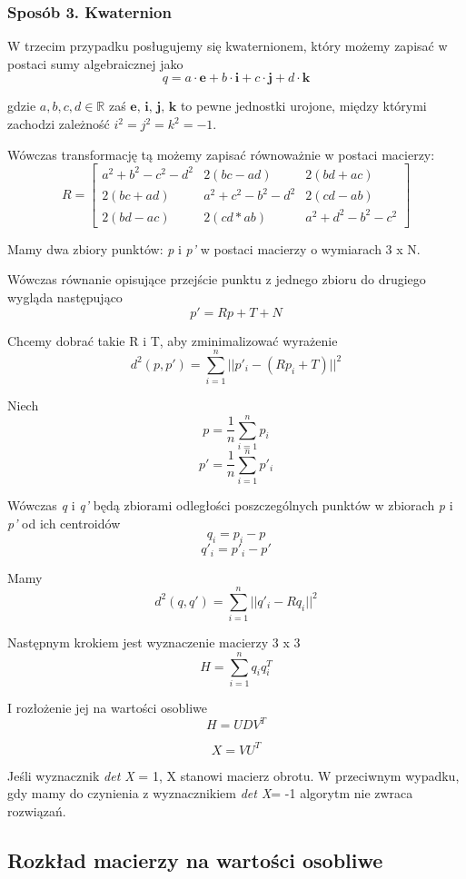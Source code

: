 \documentclass[12pt]{article}
\begin{document}
\subsubsection{Sposób 3. Kwaternion}
W trzecim przypadku posługujemy się kwaternionem, który możemy zapisać w postaci sumy algebraicznej jako
\[q = a \cdot \textbf{e} + b \cdot \textbf{i} + c \cdot \textbf{j} + d \cdot \textbf{k} \]

gdzie $a, b, c, d \in \mathbb{R}$ zaś $\textbf{e, i, j, k}$ to pewne jednostki urojone, między którymi zachodzi zależność $i^2 = j^2 = k^2 = -1$.

Wówczas transformację tą możemy zapisać równoważnie w postaci macierzy:
\[
R = \begin{bmatrix}
a^2+b^2-c^2-d^2 & 2(bc-ad) & 2(bd+ac) \\
2(bc+ad) & a^2+c^2-b^2-d^2 & 2(cd-ab) \\
2(bd-ac) & 2(cd*ab) & a^2+d^2-b^2-c^2
\end{bmatrix}
\]

Mamy dwa zbiory punktów: \emph{p} i \emph{p'} w postaci macierzy o wymiarach 3 x N.

Wówczas równanie opisujące przejście punktu z jednego zbioru do drugiego wygląda następująco
\[p' = R p + T + N \]

Chcemy dobrać takie R i T, aby zminimalizować wyrażenie
\[ d^2(p, p') = \sum_{i=1}^n || p'_{i} - (Rp_{i}+T)||^2 \]

Niech 
\[p = \frac{1}{n} \sum_{i=1}^n p_{i} \]
\[p' = \frac{1}{n} \sum_{i=1}^n p'_{i} \]

Wówczas \emph{q} i \emph{q'} będą zbiorami odległości poszczególnych punktów w zbiorach \emph{p} i \emph{p'} od ich centroidów
\[q_{i} = p_{i} - p \]
\[q'_{i} = p'_{i} - p' \]

Mamy
\[d^2(q, q') = \sum_{i=1}^n || q'_{i} - Rq_{i}||^2 \]

Następnym krokiem jest wyznaczenie macierzy 3 x 3 
\[H = \sum_{i=1}^n q_{i} q_{i}^T \]

I rozłożenie jej na wartości osobliwe
\[H = UDV^T \]

\[X = VU^T \]

Jeśli wyznacznik \emph{det X} = 1, X stanowi macierz obrotu. W przeciwnym wypadku, gdy mamy do czynienia z wyznacznikiem \emph{det X}= -1 algorytm nie zwraca rozwiązań. 

\newpage
\subsection{Rozkład macierzy na wartości osobliwe}
\end{document}
